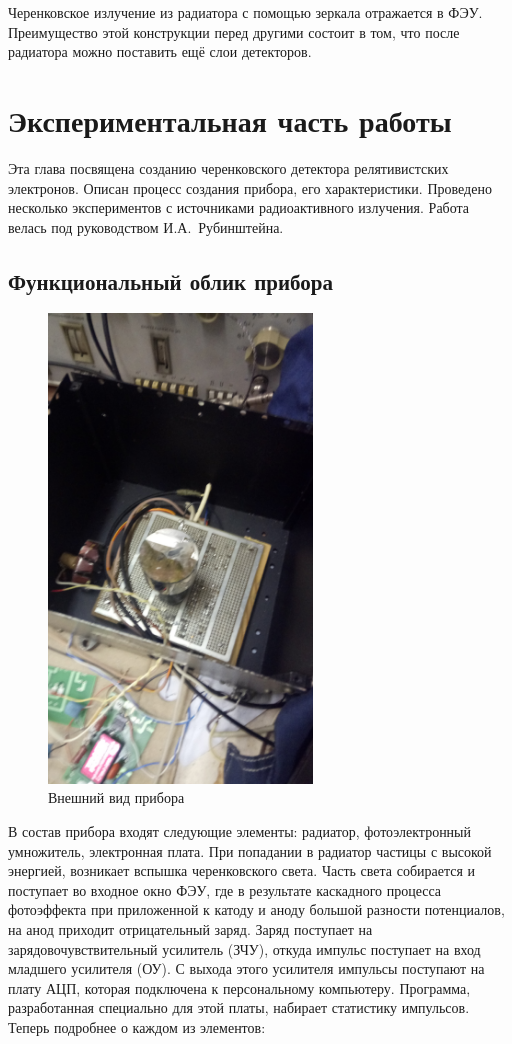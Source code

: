 \documentclass[12pt,a4paper]{report} %
\begin{document}
Черенковское излучение из радиатора с помощью зеркала отражается в ФЭУ. Преимущество этой конструкции перед другими состоит в том, что  после радиатора можно поставить ещё слои детекторов.

\chapter{Экспериментальная часть работы}
Эта глава посвящена созданию черенковского детектора релятивистских электронов. Описан процесс создания прибора, его характеристики. Проведено несколько экспериментов с источниками радиоактивного излучения. Работа велась под руководством И.А.~Рубинштейна.
\section{Функциональный облик прибора}
\begin{figure}[t]
	\hfill
	\includegraphics[width=70mm]{pictures/pribor.jpg}
	\hfill
	\caption{Внешний вид прибора}
	\label{pribor}
\end{figure}
В состав прибора входят следующие элементы: радиатор, фотоэлектронный умножитель, электронная плата. При попадании в радиатор частицы с высокой энергией, возникает вспышка черенковского света. Часть света собирается и поступает во входное окно ФЭУ, где в результате каскадного процесса фотоэффекта при приложенной к катоду и аноду большой разности потенциалов, на анод приходит отрицательный заряд. Заряд поступает на зарядовочувствительный усилитель (ЗЧУ), откуда импульс поступает на вход младшего усилителя (ОУ). С выхода этого усилителя импульсы поступают на плату АЦП, которая подключена к персональному компьютеру. Программа, разработанная специально для этой платы, набирает статистику импульсов. Теперь подробнее о каждом из элементов:
\end{document}
